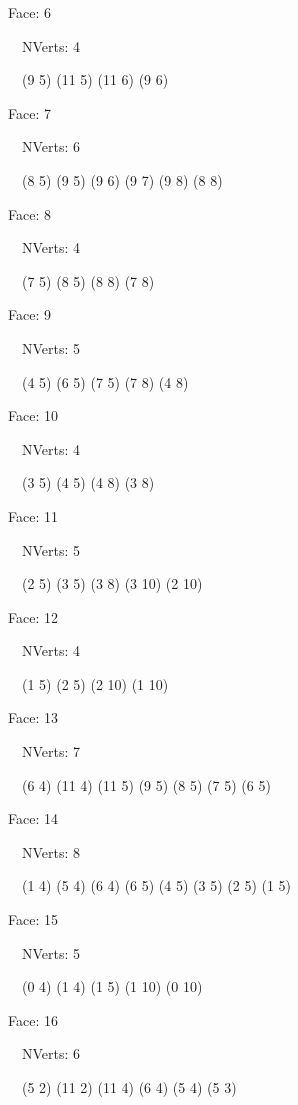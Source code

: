 \documentclass{article}
\begin{document}
{\footnotesize 

Face: 6

\   \    NVerts: 4

 \   \   (9 5) (11 5) (11 6) (9 6)}

{\footnotesize 

Face: 7

\   \    NVerts: 6

 \   \   (8 5) (9 5) (9 6) (9 7) (9 8) (8 8)}

{\footnotesize 

Face: 8

\   \    NVerts: 4

 \   \   (7 5) (8 5) (8 8) (7 8)}

{\footnotesize 

Face: 9

\   \    NVerts: 5

 \   \   (4 5) (6 5) (7 5) (7 8) (4 8)}

{\footnotesize 

Face: 10

\   \    NVerts: 4

 \   \   (3 5) (4 5) (4 8) (3 8)}

{\footnotesize 

Face: 11

\   \    NVerts: 5

 \   \   (2 5) (3 5) (3 8) (3 10) (2 10)}

{\footnotesize 

Face: 12

\   \    NVerts: 4

 \   \   (1 5) (2 5) (2 10) (1 10)}

{\footnotesize 

Face: 13

\   \    NVerts: 7

 \   \   (6 4) (11 4) (11 5) (9 5) (8 5) (7 5) (6 5)}

{\footnotesize 

Face: 14

\   \    NVerts: 8

 \   \   (1 4) (5 4) (6 4) (6 5) (4 5) (3 5) (2 5) (1 5)}

{\footnotesize 

Face: 15

\   \    NVerts: 5

 \   \   (0 4) (1 4) (1 5) (1 10) (0 10)}

{\footnotesize 

Face: 16

\   \    NVerts: 6

 \   \   (5 2) (11 2) (11 4) (6 4) (5 4) (5 3)}
\end{document}
